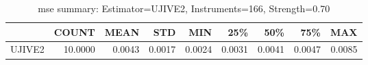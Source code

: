 \begin{table}[ht]
\centering
\caption{mse summary: Estimator=UJIVE2, Instruments=166, Strength=0.70}
\begin{tabular}{lrrrrrrrr}
\toprule
 & COUNT & MEAN & STD & MIN & 25\% & 50\% & 75\% & MAX \\
\midrule
UJIVE2 & 10.0000 & 0.0043 & 0.0017 & 0.0024 & 0.0031 & 0.0041 & 0.0047 & 0.0085 \\
\bottomrule
\end{tabular}
\end{table}
